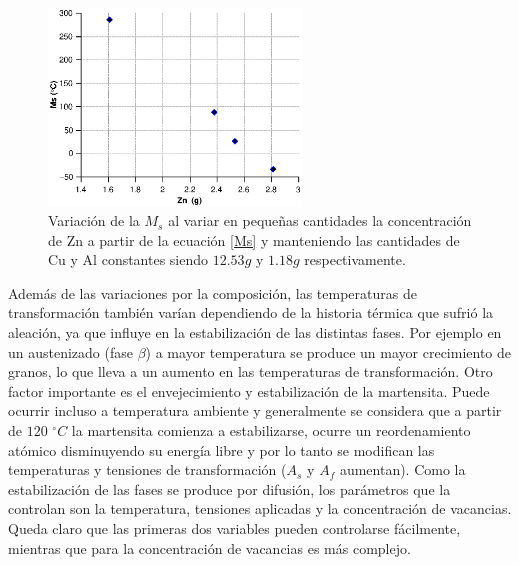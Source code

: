 \documentclass[a4paper,12pt,fleqn,twoside,openany]{book}
\begin{document}
\begin{figure}[h]
 \centering
 \includegraphics[width=0.6\textwidth]{Img/Introduccion/MsZn2.eps}
 \caption{Variación de la $M_s$ al variar en pequeñas cantidades la concentración de Zn a partir de la ecuación \ref{Ms} y manteniendo las cantidades de Cu y Al constantes siendo $12.53 g$ y $1.18 g$ respectivamente.}
 \label{fig:mstab}
\end{figure}


Además de las variaciones por la composición, las temperaturas de transformación también varían dependiendo de la historia térmica que sufrió la aleación, ya que influye en la estabilización 
de las distintas fases. Por ejemplo en un austenizado (fase $\beta$) a mayor temperatura se produce un mayor crecimiento de granos, lo que lleva a un aumento en las 
temperaturas de transformación. Otro factor importante es el envejecimiento y estabilización de la martensita. Puede ocurrir incluso a temperatura ambiente y generalmente se considera que a partir de $120$ $^\circ C $ la martensita comienza 
a estabilizarse, ocurre un reordenamiento atómico disminuyendo su energía libre y por lo tanto se modifican las temperaturas y tensiones de transformación ($A_s$ y $A_f$ aumentan). Como la estabilización 
de las fases se produce por difusión, los parámetros que la controlan son la temperatura, tensiones aplicadas y la concentración de vacancias. Queda claro que las 
primeras dos variables pueden controlarse fácilmente, mientras que para la concentración de vacancias es más complejo.
\end{document}
